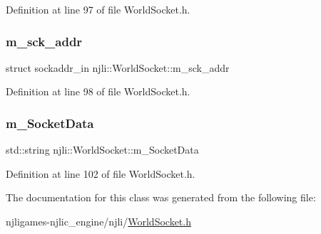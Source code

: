 Definition at line 97 of file World\+Socket.\+h.

\mbox{\label{classnjli_1_1_world_socket_ab8eaf650ed60181c5984c50190967952}} 
\subsubsection{\texorpdfstring{m\+\_\+sck\+\_\+addr}{m\_sck\_addr}}
{\footnotesize\ttfamily struct sockaddr\+\_\+in njli\+::\+World\+Socket\+::m\+\_\+sck\+\_\+addr\hspace{0.3cm}{\ttfamily [private]}}



Definition at line 98 of file World\+Socket.\+h.

\mbox{\label{classnjli_1_1_world_socket_ad139dd74c61b2663bfb08861cc51f1b5}} 
\subsubsection{\texorpdfstring{m\+\_\+\+Socket\+Data}{m\_SocketData}}
{\footnotesize\ttfamily std\+::string njli\+::\+World\+Socket\+::m\+\_\+\+Socket\+Data\hspace{0.3cm}{\ttfamily [private]}}



Definition at line 102 of file World\+Socket.\+h.



The documentation for this class was generated from the following file\+:\begin{DoxyCompactItemize}
\item 
njligames-\/njlic\+\_\+engine/njli/\mbox{\hyperlink{_world_socket_8h}{World\+Socket.\+h}}\end{DoxyCompactItemize}
